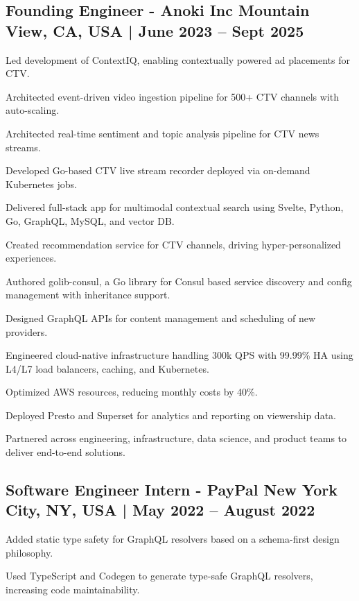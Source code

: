 \subsection{{Founding Engineer - Anoki Inc \hfill  Mountain View, CA, USA  | June 2023 -- Sept 2025}}
\begin{zitemize}
\item Led development of ContextIQ, enabling contextually powered ad placements for CTV.
\item Architected event-driven video ingestion pipeline for 500+ CTV channels with auto-scaling.
\item Architected real-time sentiment and topic analysis pipeline for CTV news streams.
\item Developed Go-based CTV live stream recorder deployed via on-demand Kubernetes jobs.
\item Delivered full-stack app for multimodal contextual search using Svelte, Python, Go, GraphQL, MySQL, and vector DB.
\item Created recommendation service for CTV channels, driving hyper-personalized experiences.
\item Authored golib-consul, a Go library for Consul based service discovery and config management with inheritance support.
\item Designed GraphQL APIs for content management and scheduling of new providers.
\item Engineered cloud-native infrastructure handling 300k QPS with 99.99\% HA using L4/L7 load balancers, caching, and Kubernetes.
\item Optimized AWS resources, reducing monthly costs by 40\%.
\item Deployed Presto and Superset for analytics and reporting on viewership data.
\item Partnered across engineering, infrastructure, data science, and product teams to deliver end-to-end solutions.
\end{zitemize}

\subsection{{Software Engineer Intern - PayPal \hfill New York City, NY, USA | May 2022 -- August 2022}}
\begin{zitemize}
\item Added static type safety for GraphQL resolvers based on a schema-first design philosophy.
\item Used TypeScript and Codegen to generate type-safe GraphQL resolvers, increasing code maintainability.
\end{zitemize}

